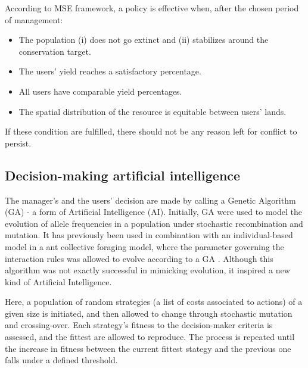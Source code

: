 \documentclass[12pt,a4paper]{article}
\begin{document}
According to MSE framework, a policy is effective when, after the chosen period of management:
\begin{itemize}
    \item The population (i) does not go extinct and (ii) stabilizes around the conservation target.
    \item The users' yield reaches a satisfactory percentage.
    \item All users have comparable yield percentages.
    \item The spatial distribution of the resource is equitable between users' lands.
\end{itemize}
If these condition are fulfilled, there should not be any reason left for conflict to persist.

\subsection{Decision-making artificial intelligence}

The manager's and the users' decision are made by calling a Genetic Algorithm (GA) - a form of Artificial Intelligence (AI).
Initially, GA were used to model the evolution of allele frequencies in a population under stochastic recombination and mutation.
It has previously been used in combination with an individual-based model in a ant collective foraging model, where the parameter governing the interaction rules was allowed to evolve according to a GA \citep{hamblin2013practical}.
Although this algorithm was not exactly successful in mimicking evolution, it inspired a new kind of Artificial Intelligence.

Here, a population of random strategies (a list of costs associated to actions) of a given size is initiated, and then allowed to change through stochastic mutation and crossing-over.
Each strategy's fitness to the decision-maker criteria is assessed, and the fittest are allowed to reproduce.
The process is repeated until the increase in fitness between the current fittest stategy and the previous one falls under a defined threshold.
\end{document}
